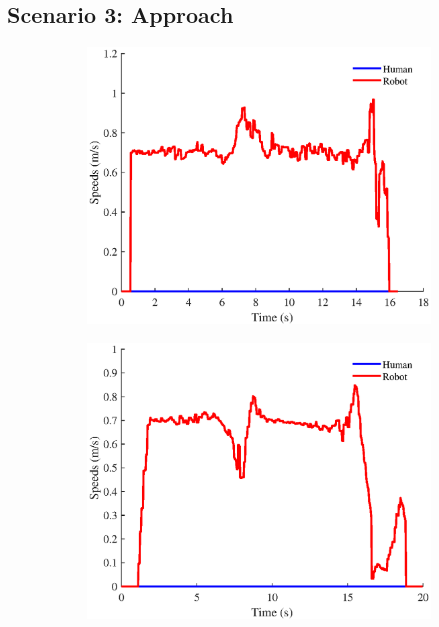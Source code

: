 \subsection{Scenario 3: Approach}
\begin{figure}[h!]
\centering
\hspace{-0.15cm}
\begin{subfigure}{.5\columnwidth}
  \includegraphics[width=\textwidth]{images/chapter6/smb/approach_vel.eps}
\end{subfigure}
\hspace{-0.75cm}
\begin{subfigure}{.5\columnwidth}
  \includegraphics[width=\textwidth]{images/chapter6/cohan/approach_vel.eps}

\end{subfigure}
\end{figure}
